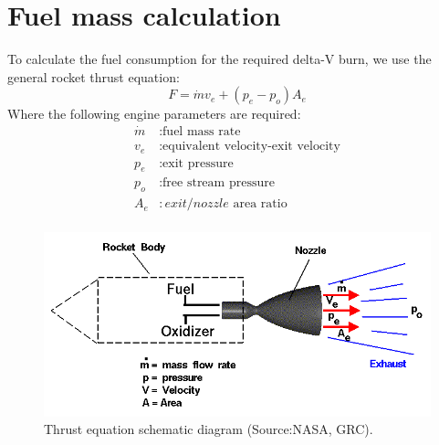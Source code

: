 \section{Fuel mass calculation}
To calculate the fuel consumption for the required delta-V burn, we use the general rocket thrust equation:
\begin{equation}
F = \dot{m}v_e+(p_e-p_o)A_e
\end{equation}
Where the following engine parameters are required:
\begin{equation}
\begin{split}
\dot{m}&:\text{fuel mass rate}\\
v_e&:\text{equivalent velocity-exit velocity}\\
p_e&:\text{exit pressure}\\
p_o&:\text{free stream pressure}\\
A_e&:exit/nozzle \text{ area ratio}\\
\end{split}
\end{equation}

\begin{figure}[htb!]
\centering
\includegraphics[scale=0.4]{figures/Orbiter/rockth.png}
\caption{Thrust equation schematic diagram (Source:NASA, GRC).\cite{rocketeq}}
\label{fig:rocketim}
\end{figure}

